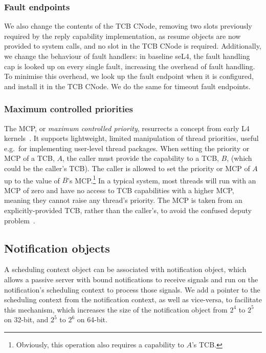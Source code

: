 \subsubsection{Fault endpoints}

We also change the contents of the TCB CNode, removing two slots previously required by the reply
capability implementation, as resume objects are now provided to  system calls, and
no slot in the TCB CNode is required. Additionally, we change the behaviour of fault handlers: in
baseline seL4, the fault handling cap is looked up on every single fault, increasing the overhead of
fault handling. To minimise this overhead, we look up the fault endpoint when it is configured, and
install it in the TCB CNode. We do the same for timeout fault endpoints. 

\subsubsection{Maximum controlled priorities}

The MCP, or \emph{maximum controlled priority}, resurrects a concept from early L4
kernels~\citep{Liedtke_96:rm}. It supports lightweight, limited manipulation of thread priorities,
useful e.g.\ for implementing user-level thread packages. When setting
the priority or MCP of a TCB, \(A\),
the caller must provide the capability to a TCB, \(B\), (which could be the caller's
TCB). The caller is allowed to set the priority or MCP of \(A\) up to the value
of \(B\)'s MCP.\footnote{Obviously, this operation also requires a capability to \(A\)'s TCB.}
In a typical system, most threads
will run with an MCP of zero and have no access to TCB capabilities with a higher MCP, meaning they
cannot raise any thread's priority.
The MCP is taken from an explicitly-provided TCB, rather than the caller's, to avoid the
confused deputy problem~\citep{Hardy_88}.

\subsection{Notification objects}

A scheduling context object can be associated with notification object, which allows a passive
server with bound notifications to receive signals and run on the notification's
scheduling context to process those signals.
We add a pointer to the scheduling context from the notification context, as well as vice-versa, to 
facilitate this mechanism, which increases the size of the notification object from $2^{4}$ to
$2^{5}$ on 32-bit, and $2^{5}$ to $2^{6}$ on 64-bit. 

